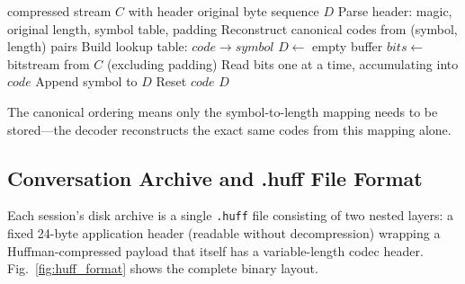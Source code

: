 \documentclass[conference]{IEEEtran}
\begin{document}
\begin{algorithm}[h]
\caption{Canonical Huffman Decoding}
\label{alg:huffman_decode}
\begin{algorithmic}[1]
\REQUIRE compressed stream $C$ with header
\ENSURE original byte sequence $D$
\STATE Parse header: magic, original length, symbol table, padding
\STATE Reconstruct canonical codes from (symbol, length) pairs
\STATE Build lookup table: $code \rightarrow symbol$
\STATE $D \leftarrow$ empty buffer
\STATE $bits \leftarrow$ bitstream from $C$ (excluding padding)
  \STATE Read bits one at a time, accumulating into $code$
    \STATE Append symbol to $D$
    \STATE Reset $code$
  \ENDIF
\ENDWHILE
\RETURN $D$
\end{algorithmic}
\end{algorithm}

The canonical ordering means only the symbol-to-length mapping needs to be stored---the decoder reconstructs the exact same codes from this mapping alone.

\subsection{Conversation Archive and .huff File Format}

Each session's disk archive is a single \texttt{.huff} file consisting of two nested layers: a fixed 24-byte application header (readable without decompression) wrapping a Huffman-compressed payload that itself has a variable-length codec header. Fig.~\ref{fig:huff_format} shows the complete binary layout.
\end{document}
